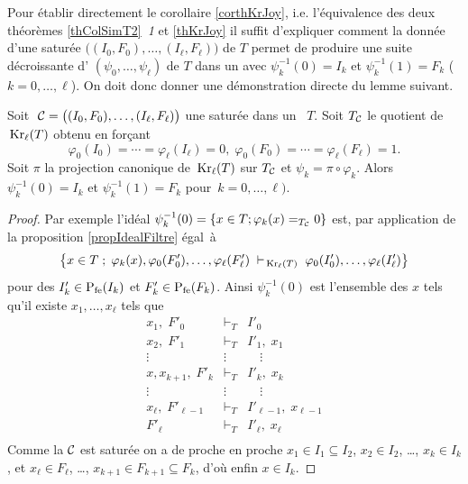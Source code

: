 Pour établir directement le corollaire \ref{corthKrJoy}, i.e. l'équivalence des deux théorèmes \ref{thColSimT2}~\emph{1} et \ref{thKrJoy}  il suffit d'expliquer comment
la donnée d'une \proc saturée  $\big((I_0,F_0),\ldots,(I_\ell,F_\ell)\big)$   
de $T$ permet de produire une suite décroissante d'\homos 
$(\psi_0,\ldots,\psi_\ell)$ de $T$ dans un
\trdi  avec  $\psi_k^{-1}(0)=I_k$ et
$\psi_k^{-1}(1)=F_k$ ($k=0,\ldots,\ell$). 
On doit donc donner une démonstration directe du 
lemme
suivant.
\begin{lemma}
\label{lemProcEtKrl}
%
%
Soit $\;{\cal C}=\big((I_0,F_0),\ldots,(I_\ell,F_\ell)\big)$ une \proc saturée dans un \trdi~$T$. 
Soit  $T_{\cal C}$ le \trdi quotient de  $\,{\rm Kr}_\ell(T)$ obtenu en forçant
$$\varphi_0(I_0)=\cdots=\varphi_\ell(I_\ell)=0,\;
\varphi_0(F_0)=\cdots=\varphi_\ell(F_\ell)=1.$$ Soit $\pi$ la projection
canonique de $\,{\rm Kr}_\ell(T)$ sur $T_{\cal C}$ et $\psi_k=\pi\circ\varphi_k$.
Alors $\psi_k^{-1}(0)=I_k$ et $\psi_k^{-1}(1)=F_k$ \hbox{pour $k=0,\ldots,\ell)$}.

%
%
%

\end{lemma}
\begin{proof}
Par exemple l'idéal $\psi_k^{-1}(0)=\left\{x\in T;\varphi_k(x)=_{T_{\cal C}}0\right\}$
est, par application de la proposition \ref{propIdealFiltre} égal~à
$$ \left\{x\in 
T\;;\;\varphi_k(x),\varphi_0(F'_0),\ldots,\varphi_\ell(F'_\ell)
\;\vdash_{\,{\rm Kr}_\ell(T)}\; \varphi_0(I'_0),\ldots,\varphi_\ell(I'_\ell) 
\right\}
$$
pour des $I'_k\in{{\rm P}_{{\rm fe}}}(I_k)$ et $F'_k\in{{\rm P}_{{\rm fe}}}(F_k)$. 
Ainsi $\psi_k^{-1}(0)$ est l'ensemble des $x$ tels qu'il existe $x_1,\ldots,x_\ell$ tels que
$$\begin{array}{rcl}
x_1,\;  F'_0& \vdash_T  &  I'_0  \\
x_2,\;  F'_1& \vdash_T  &  I'_1 ,\; x_1  \\
    \vdots\quad & \vdots  & \quad\vdots  \\
x,x_{k+1},\;  F'_k& \vdash_T  &  I'_k ,\; x_k  \\
    \vdots\quad & \vdots  & \quad\vdots  \\
x_\ell,\;  F'_{\ell-1}& \vdash_T& I'_{\ell-1} ,\; x_{\ell-1}  \\
 F'_\ell& \vdash_T  &  I'_\ell ,\; x_\ell  \\
\end{array}$$
Comme la \proc ${\cal C}$ est saturée on a de proche en proche
$x_1\in I_1\subseteq I_2$, $x_2\in I_2$, \dots,  $x_k\in I_k$, et  
$x_\ell\in
F_\ell$, \dots,
$x_{k+1}\in F_{k+1}\subseteq F_k$, d'où enfin $x\in I_k$.
\end{proof}

